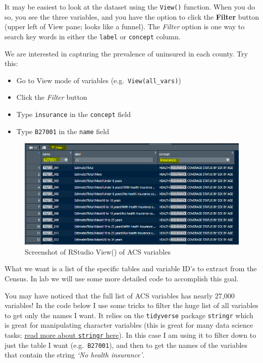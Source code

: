 \documentclass[
]{book}
\providecommand{\tightlist}{%
  \setlength{\itemsep}{0pt}\setlength{\parskip}{0pt}}
\begin{document}
It may be easiest to look at the dataset using the \texttt{View()} function. When you do so, you see the three variables, and you have the option to click the \textbf{Filter} button (upper left of View pane; looks like a funnel). The \emph{Filter} option is one way to search key words in either the \texttt{label} or \texttt{concept} column.

We are interested in capturing the prevalence of uninsured in each county. Try this:

\begin{itemize}
\tightlist
\item
  Go to View mode of variables (e.g.~\texttt{View(all\_vars)})
\item
  Click the \emph{Filter} button
\item
  Type \texttt{insurance} in the \texttt{concept} field
\item
  Type \texttt{B27001} in the \texttt{name} field
\end{itemize}

\begin{figure}
\centering
\includegraphics{images/acs-var-view.PNG}
\caption{\label{fig:unnamed-chunk-13}Screenshot of RStudio View() of ACS variables}
\end{figure}

What we want is a list of the specific tables and variable ID's to extract from the Census. In lab we will use some more detailed code to accomplish this goal.

You may have noticed that the full list of ACS variables has nearly 27,000 variables! In the code below I use some tricks to filter the huge list of all variables to get only the names I want. It relies on the \texttt{tidyverse} package \texttt{stringr} which is great for manipulating character variables (this is great for many data science tasks; \href{https://stringr.tidyverse.org/}{read more about \texttt{stringr} here}). In this case I am using it to filter down to just the table I want (e.g.~\texttt{B27001}), and then to get the names of the variables that contain the string \emph{`No health insurance'}.
\end{document}
